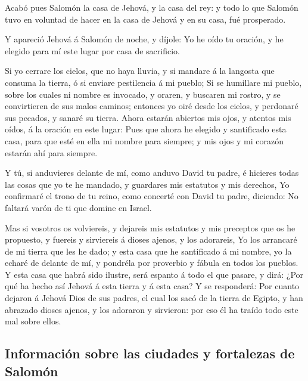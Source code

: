  Acabó pues Salomón la casa de Jehová, y la casa del rey: y
todo lo que Salomón tuvo en voluntad de hacer en la casa de Jehová y en
su casa, fué prosperado.

 Y apareció Jehová á Salomón de noche, y díjole: Yo he oído
tu oración, y he elegido para mí este lugar por casa de sacrificio.

 Si yo cerrare los cielos, que no haya lluvia, y si mandare
á la langosta que consuma la tierra, ó si enviare pestilencia á mi
pueblo;  Si se humillare mi pueblo, sobre los cuales ni
nombre es invocado, y oraren, y buscaren mi rostro, y se convirtieren de
sus malos caminos; entonces yo oiré desde los cielos, y perdonaré sus
pecados, y sanaré su tierra.  Ahora estarán abiertos mis
ojos, y atentos mis oídos, á la oración en este lugar: 
Pues que ahora he elegido y santificado esta casa, para que esté en ella
mi nombre para siempre; y mis ojos y mi corazón estarán ahí para
siempre.

 Y tú, si anduvieres delante de mí, como anduvo David tu
padre, é hicieres todas las cosas que yo te he mandado, y guardares mis
estatutos y mis derechos,  Yo confirmaré el trono de tu
reino, como concerté con David tu padre, diciendo: No faltará varón de
ti que domine en Israel.

 Mas si vosotros os volviereis, y dejareis mis estatutos y
mis preceptos que os he propuesto, y fuereis y sirviereis á dioses
ajenos, y los adorareis,  Yo los arrancaré de mi tierra que
les he dado; y esta casa que he santificado á mi nombre, yo la echaré de
delante de mí, y pondréla por proverbio y fábula en todos los pueblos.
 Y esta casa que habrá sido ilustre, será espanto á todo el
que pasare, y dirá: ¿Por qué ha hecho así Jehová á esta tierra y á esta
casa?  Y se responderá: Por cuanto dejaron á Jehová Dios de
sus padres, el cual los sacó de la tierra de Egipto, y han abrazado
dioses ajenos, y los adoraron y sirvieron: por eso él ha traído todo
este mal sobre ellos.

\hypertarget{informaciuxf3n-sobre-las-ciudades-y-fortalezas-de-salomuxf3n}{%
\subsection{Información sobre las ciudades y fortalezas de
Salomón}\label{informaciuxf3n-sobre-las-ciudades-y-fortalezas-de-salomuxf3n}}

